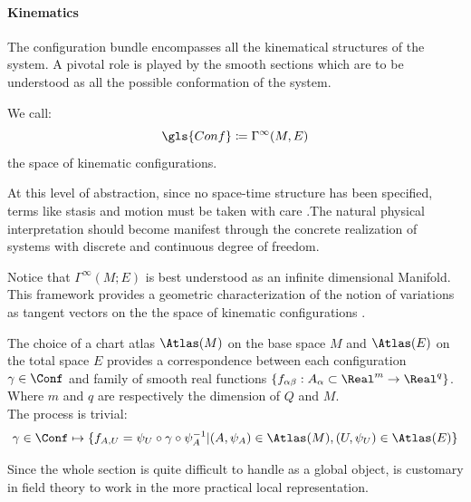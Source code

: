 \documentclass[Main]{subfiles}
\begin{document}
	
	\paragraph{Kinematics}
	The configuration bundle encompasses all the kinematical structures of the system.
	 A pivotal role is played by the smooth sections  which are to be understood as all the possible conformation of the system.

	\begin{definition}
		We call:
		\begin{displaymath}
			\gls{Conf} \coloneqq \Gamma^\infty(M,E)
		\end{displaymath}
		the space of kinematic configurations.
	\end{definition}

	At this level of abstraction, since no space-time structure has been specified, terms like stasis and motion must be taken with care .The natural physical interpretation should become manifest through the concrete realization of systems with discrete and continuous degree of freedom.
	
	\begin{observation}
	Notice that $\Gamma^\infty(M;E)$ is best understood as an infinite dimensional Manifold. 
	\\
	This framework provides a geometric characterization of the notion of variations as tangent vectors on the the space of kinematic configurations .\cite{Forger2005}
	\end{observation}
	
	\begin{observation}
	The choice of a chart atlas $\Atlas(M)$ on the base space $M$ and $\Atlas(E)$ on the total space $E$ provides a correspondence between each configuration $\gamma \in \Conf$ and family of smooth real functions $\{f_{\alpha \beta}:A_\alpha \subset \Real^m \rightarrow \Real^q \}$.
	Where $m$ and $q$ are respectively the dimension of $Q$ and $M$.	
	\\
	The process is trivial:
	\begin{displaymath}
		\gamma \in \Conf \mapsto \{f_{A,U}=\psi_U \circ \gamma \circ \psi_A^{-1} \vert (A,\psi_A) \in \Atlas(M), (U,\psi_U)\in \Atlas(E)   \}
	\end{displaymath}
	

	Since the whole section is quite difficult to handle  as a global object, is customary in field theory to work in the more practical local representation. 
	\end{observation}	
	
\end{document}
